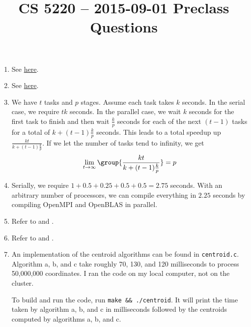\documentclass{hw}
\title{CS 5220 -- 2015-09-01 Preclass Questions}
\newcommand{\lasthw}{https://github.com/mwhittaker/lecture/blob/2015-08-27/2015-08-27/answers.pdf}
\begin{document}
\maketitle{}

\begin{enumerate}
  \item
    See \href{\lasthw{}}{here}.

  \item
    See \href{\lasthw{}}{here}.

  \item
    We have $t$ tasks and $p$ stages. Assume each task takes $k$ seconds. In
    the serial case, we require $tk$ seconds. In the parallel case, we wait $k$
    seconds for the first task to finish and then wait $\frac{k}{p}$ seconds
    for each of the next $(t - 1)$ tasks for a total of $k + (t -
    1)\frac{k}{p}$ seconds. This leads to a total speedup up $\frac{kt}{k +
    (t-1)\frac{k}{p}}$. If we let the number of tasks tend to infinity, we get
    \[
      \lim_{t \to \infty} \group{\frac{kt}{k + (t-1)\frac{k}{p}}} = p
    \]

  \item
    Serially, we require $1 + 0.5 + 0.25 + 0.5 + 0.5 = 2.75$ seconds. With an
    arbitrary number of processors, we can compile everything in $2.25$ seconds
    by compiling OpenMPI and OpenBLAS in parallel.

  \item
    Refer to  and .

  \item
    Refer to  and .

  \item
    An implementation of the centroid algorithms can be found in
    \texttt{centroid.c}. Algorithm a, b, and c take roughly 70, 130, and 120
    milliseconds to process 50,000,000 coordinates. I ran the code on my local
    computer, not on the cluster.

    To build and run the code, run \texttt{make \&\& ./centroid}. It will print
    the time taken by algorithm a, b, and c in milliseconds followed by the
    centroids computed by algorithms a, b, and c.
\end{enumerate}
\end{document}
